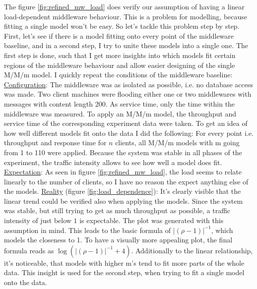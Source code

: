 \documentclass[11pt]{article}
\begin{document}
The figure \ref{fig:refined_mw_load} does verify our assumption of having a linear load-dependent middleware behaviour. This is a problem for modelling, because fitting a single model won't be easy. So let's tackle this problem step by step. First, let's see if there is a model fitting onto every point of the middleware baseline, and in a second step, I try to unite these models into a single one. The first step is done, such that I get more insights into which models fit certain regions of the middleware behaviour and allow easier designing of the single M/M/m model. I quickly repeat the conditions of the middleware baseline:
\newline\underline{Configuration}: The middleware was as isolated as possible, i.e. no database access was made. Two client machines were flooding either one or two middlewares with messages with content length 200. As service time, only the time within the middleware was measured. To apply an M/M/m model, the throughput and service time of the corresponding experiment data were taken. To get an idea of how well different models fit onto the data I did the following: For every point i.e. throughput and response time for $n$ clients, all M/M/m models with m going from 1 to 110 were applied. Because the system was stable in all phases of the experiment, the traffic intensity allows to see how well a model does fit.
\newline\underline{Expectation}: As seen in figure \ref{fig:refined_mw_load}, the load seems to relate linearly to the number of clients, so I have no reason the expect anything else of the models.
\newline\underline{Reality} (figure \ref{fig:load_dependence}): It's clearly visible that the linear trend could be verified also when applying the models. Since the system was stable, but still trying to get as much throughput as possible, a traffic intensity of just below $1$ is expectable. The plot was generated with this assumption in mind. This leads to the basic formula of $|(\rho-1)|^{-1}$, which models the closeness to 1. To have a visually more appealing plot, the final formula reads as $\log(|(\rho-1)|^{-1}+4)$. Additionally to the linear relationship, it's noticeable, that models with higher m's tend to fit more parts of the whole data. This insight is used for the second step, when trying to fit a single model onto the data.
\end{document}
